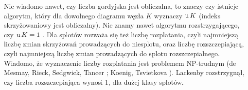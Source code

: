 Nie wiadomo nawet, czy liczba gordyjska jest obliczalna, to znaczy czy istnieje algorytm, który dla dowolnego diagramu węzła $K$ wyznaczy $\operatorname{u} K$ (indeks skrzyżowaniowy jest obliczalny).
Nie znamy nawet algorytmu rozstrzygającego, czy $\operatorname{u} K = 1$ \cite[problem 1.80]{baykur2026}.
Dla splotów rozważa się też liczbę rozplatania, czyli najmniejszą liczbę zmian skrzyżowań prowadzących do niesplotu, oraz liczbę rozszczepiającą, czyli najmniejszą liczbę zmian prowadzących do splotu rozszczepialnego.
Wiadomo, że wyznaczenie liczby rozplatania jest problemem NP-trudnym (de Mesmay, Rieck, Sedgwick, Tancer \cite{demesmay2021}; Koenig, Tsvietkova \cite{koenig2021}).
%
%
%
%
%
%
Lackenby \cite{lackenbyb2021} rozstrzygnął, czy liczba rozszczepiająca wynosi $1$, dla dużej klasy splotów.

%


